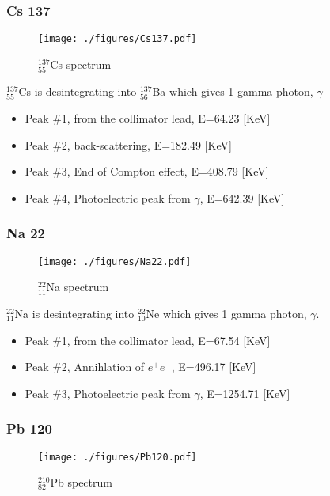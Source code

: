 \documentclass[a4paper,12pt,oneside]{article}
\begin{document}
\newpage
\subsubsection{Cs 137}
\begin{figure}[h!]
  \begin{center}
  \texttt{[image: ./figures/Cs137.pdf]}
  \caption{$_{55}^{137}$Cs spectrum} \label{fig:Cs137}
  \end{center}
\end{figure}

$_{55}^{137}$Cs is desintegrating into $_{56}^{137}$Ba which gives 1 gamma photon, $\gamma$

\begin{itemize}
\item Peak \#1, from the collimator lead, E=64.23 [KeV]
\item Peak \#2, back-scattering, E=182.49 [KeV]
\item Peak \#3, End of Compton effect, E=408.79 [KeV]
\item Peak \#4, Photoelectric peak from $\gamma$, E=642.39 [KeV]
\end{itemize}


\newpage
\subsubsection{Na 22}
\begin{figure}[h!]
  \begin{center}
  \texttt{[image: ./figures/Na22.pdf]}
  \caption{$_{11}^{22}$Na spectrum} \label{fig:Na22}
  \end{center}
\end{figure}

$_{11}^{22}$Na is desintegrating into $_{10}^{22}$Ne which gives 1 gamma photon, $\gamma$.

\begin{itemize}
\item Peak \#1, from the collimator lead, E=67.54 [KeV]
\item Peak \#2, Annihlation of $e^+e^-$, E=496.17 [KeV]
\item Peak \#3, Photoelectric peak from $\gamma$, E=1254.71 [KeV]
\end{itemize}


\newpage
\subsubsection{Pb 120}
\begin{figure}[h!]
  \begin{center}
  \texttt{[image: ./figures/Pb120.pdf]}
  \caption{$_{82}^{210}$Pb spectrum} \label{fig:Pb120}
  \end{center}
\end{figure}
\end{document}
